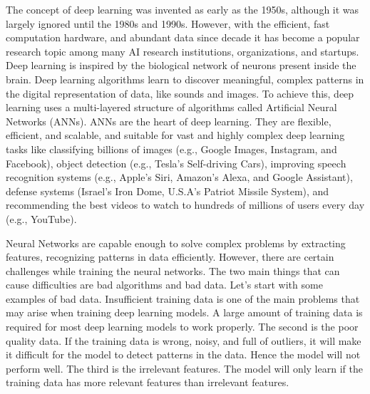 The concept of deep learning was invented as early as the 1950s, although it was largely ignored until the 1980s and 1990s. However, with the efficient, fast computation hardware, and abundant data since decade it has become a popular research topic among many \ac{AI} research institutions, organizations, and startups. Deep learning is inspired by the biological network of neurons present inside the brain. Deep learning algorithms learn to discover meaningful, complex patterns in the digital representation of data, like sounds and images. To achieve this, deep learning uses a multi-layered structure of algorithms called Artificial Neural Networks (\acp{ANN}). \acp{ANN} are the heart of deep learning. They are flexible, efficient, and scalable, and suitable for vast and highly complex deep learning tasks like classifying billions of images (e.g., Google Images, Instagram, and Facebook), object detection (e.g., Tesla's Self-driving Cars), improving speech recognition systems (e.g., Apple's Siri, Amazon's Alexa, and Google Assistant), defense systems (Israel's Iron Dome, U.S.A's Patriot Missile System), and recommending the best videos to watch to hundreds of millions of users every day (e.g., YouTube).

Neural Networks are capable enough to solve complex problems by extracting features, recognizing patterns in data efficiently. However, there are certain challenges while training the neural networks. The two main things that can cause difficulties are bad algorithms and bad data. Let's start with some examples of bad data. Insufficient training data is one of the main problems that may arise when training deep learning models. A large amount of training data is required for most deep learning models to work properly. The second is the poor quality data. If the training data is wrong, noisy, and full of outliers, it will make it difficult for the model to detect patterns in the data. Hence the model will not perform well. The third is the irrelevant features. The model will only learn if the training data has more relevant features than irrelevant features. 


